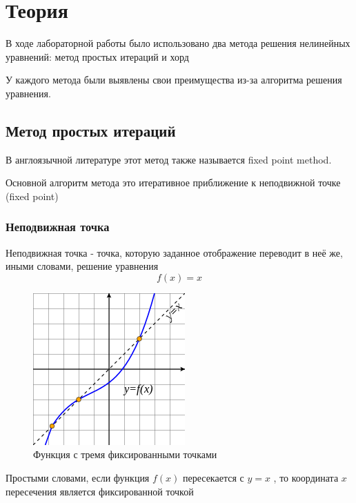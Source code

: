 \documentclass[11pt, english]{article}
\begin{document}
\newcommand{\CC}{C\nolinebreak\hspace{-.05em}\raisebox{.4ex}{\tiny\bf +}\nolinebreak\hspace{-.10em}\raisebox{.4ex}{\tiny\bf +}}
\def\CC{{C\nolinebreak[4]\hspace{-.05em}\raisebox{.4ex}{\tiny\bf ++}}}


\section{Теория}
В ходе лабораторной работы было использовано два метода решения нелинейных уравнений: метод простых итераций и хорд

У каждого метода были выявлены свои преимущества из-за алгоритма решения уравнения.

\subsection{Метод простых итераций}
В англоязычной литературе этот метод также называется fixed point method.

Основной алгоритм метода это итеративное приближение к неподвижной точке (fixed point)

\subsubsection{Неподвижная точка}
Неподвижная точка - точка, которую заданное отображение переводит в неё же, иными словами, решение уравнения $$f(x)=x$$

\begin{figure}[h!]
    \centering
    \includegraphics{fixed_point_wiki_example.png}
    \caption{Функция с тремя фиксированными точками}
    \label{fig:my_label}
\end{figure}

Простыми словами, если функция $f(x)$ пересекается с $y=x$ , то координата $x$ пересечения является фиксированной точкой
\end{document}
